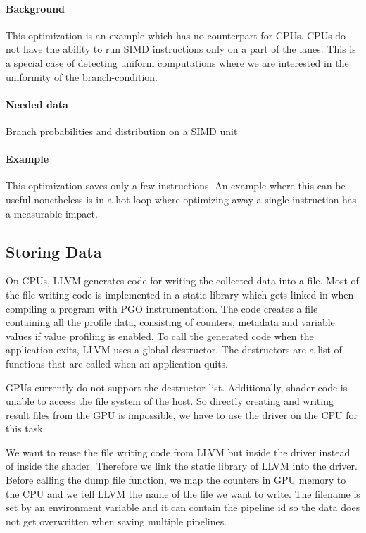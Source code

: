 \paragraph{Background} This optimization is an example which has no counterpart for CPUs. CPUs do not have the ability to run SIMD instructions only on a part of the lanes. This is a special case of detecting uniform computations where we are interested in the uniformity of the branch-condition.
\paragraph{Needed data} Branch probabilities and distribution on a SIMD unit
\paragraph{Example} This optimization saves only a few instructions. An example where this can be useful nonetheless is in a hot loop where optimizing away a single instruction has a measurable impact.

\subsection{Storing Data}
\label{sub:save-design}
On CPUs, LLVM generates code for writing the collected data into a file.
Most of the file writing code is implemented in a static library which gets linked in when compiling a program with PGO instrumentation.
The code creates a file containing all the profile data, consisting of counters, metadata and variable values if value profiling is enabled.
To call the generated code when the application exits, LLVM uses a global destructor.
The destructors are a list of functions that are called when an application quits.

GPUs currently do not support the destructor list. Additionally, shader code is unable to access the file system of the host.
So directly creating and writing result files from the GPU is impossible, we have to use the driver on the CPU for this task.

We want to reuse the file writing code from LLVM but inside the driver instead of inside the shader.
Therefore we link the static library of LLVM into the driver.
Before calling the dump file function, we map the counters in GPU memory to the CPU and we tell LLVM the name of the file we want to write.
The filename is set by an environment variable and it can contain the pipeline id so the data does not get overwritten when saving multiple pipelines.

